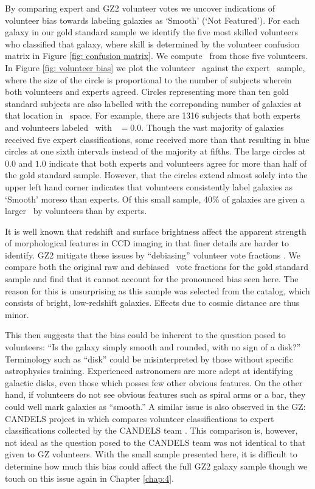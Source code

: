 By comparing expert and GZ2 volunteer votes we uncover indications of volunteer bias towards labeling galaxies as `Smooth' (`Not Featured'). For each galaxy in our gold standard sample we identify the five most skilled volunteers who classified that galaxy, where skill is determined by the volunteer confusion matrix in Figure \ref{fig: confusion matrix}. We compute \fsmooth~from those five volunteers. In Figure \ref{fig: volunteer bias} we plot the volunteer \fsmooth~against the expert \fsmooth~sample, where the size of the circle is proportional to the number of subjects wherein both volunteers and experts agreed. Circles representing more than ten gold standard subjects are also labelled with the correponding number of galaxies at that location in \fsmooth~space. For example, there are 1316 subjects that both experts and volunteers labeled \feat~with \fsmooth~$ = 0.0$. Though the vast majority of galaxies received five expert classifications, some received more than that resulting in blue circles at one sixth intervals instead of the majority at fifths. The large circles at $0.0$ and $1.0$ indicate that both experts and volunteers agree for more than half of the gold standard sample. However, that the circles extend almost solely into the upper left hand corner indicates that volunteers consistently label galaxies as `Smooth' moreso than experts. Of this small sample, 40\% of galaxies are given a larger \fsmooth~by volunteers than by experts. 

It is well known that redshift and surface brightness affect the apparent strength of morphological features in CCD imaging in that finer details are harder to identify. GZ2 mitigate these issues by ``debiasing'' volunteer vote fractions \citep{Willett2013}. We compare both the original raw and debiased \fsmooth~vote fractions for the gold standard sample and find that it cannot account for the pronounced bias seen here. The reason for this is unsurprising as this sample was selected from the \cite{NairAbraham2010} catalog, which consists of bright, low-redshift galaxies. Effects due to cosmic distance are thus minor. 

This then suggests that the bias could be inherent to the question posed to volunteers: ``Is the galaxy simply smooth and rounded, with no sign of a disk?'' Terminology such as ``disk'' could be misinterpreted by those without specific astrophysics training. Experienced astronomers are more adept at identifying galactic disks, even those which posses few other obvious features. On the other hand, if volunteers do not see obvious features such as spiral arms or a bar, they could well mark galaxies as ``smooth.''  A similar issue is also observed in the GZ: CANDELS project in which \cite{Simmons2017} compares volunteer classifications to expert classifications collected by the CANDELS team \citep{Kartaltepe2015}. This comparison is, however, not ideal as the question posed to the CANDELS team was not identical to that given to GZ volunteers. With the small sample presented here, it is difficult to determine how much this bias could affect the full GZ2 galaxy sample though we touch on this issue again in Chapter \ref{chap:4}. 




